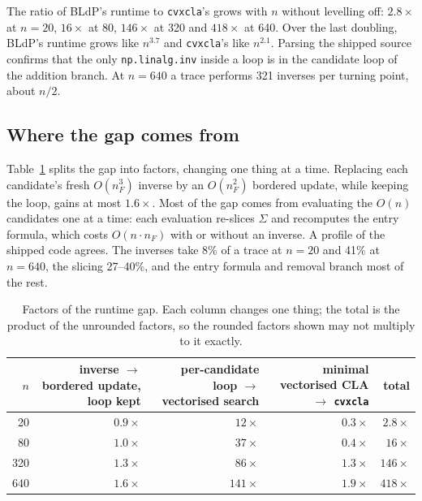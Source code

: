 \documentclass[11pt,a4paper]{article}
\newcommand{\code}[1]{\texttt{#1}}
\newcommand{\cvxcla}{\code{cvxcla}}
\begin{document}
The ratio of BLdP's runtime to \cvxcla{}'s grows with $n$ without levelling
off: $2.8\times$ at $n = 20$, $16\times$ at 80, $146\times$ at 320 and
$418\times$ at 640. Over the last doubling, BLdP's runtime grows like
$n^{3.7}$ and \cvxcla{}'s like $n^{2.1}$. Parsing the shipped source confirms
that the only \code{np.linalg.inv} inside a loop is in the candidate loop of
the addition branch. At $n = 640$ a trace performs 321 inverses per turning
point, about $n/2$.

\subsection{Where the gap comes from}

Table~\ref{tab:gap} splits the gap into factors, changing one thing at a time.
Replacing each candidate's fresh $O(n_F^3)$ inverse by an $O(n_F^2)$ bordered
update, while keeping the loop, gains at most $1.6\times$. Most of the gap
comes from evaluating the $O(n)$ candidates one at a time: each evaluation
re-slices $\Sigma$ and recomputes the entry formula, which costs
$O(n \cdot n_F)$ with or without an inverse. A profile of the shipped code
agrees. The inverses take 8\% of a trace at $n = 20$ and 41\% at $n = 640$,
the slicing 27--40\%, and the entry formula and removal branch most of the
rest.

\begin{table}[ht]
  \centering
  \small
  \caption{Factors of the runtime gap. Each column changes one thing; the
    total is the product of the unrounded factors, so the rounded factors
    shown may not multiply to it exactly.}\label{tab:gap}
  \begin{tabular}{rrrrr}
    \toprule
    $n$ & \shortstack[r]{inverse $\to$ bordered\\update, loop kept}
        & \shortstack[r]{per-candidate loop $\to$\\vectorised search}
        & \shortstack[r]{minimal vectorised\\CLA $\to$ \cvxcla{}}
        & total \\
    \midrule
    20  & $0.9\times$ & $12\times$  & $0.3\times$ & $2.8\times$ \\
    80  & $1.0\times$ & $37\times$  & $0.4\times$ & $16\times$  \\
    320 & $1.3\times$ & $86\times$  & $1.3\times$ & $146\times$ \\
    640 & $1.6\times$ & $141\times$ & $1.9\times$ & $418\times$ \\
    \bottomrule
  \end{tabular}
\end{table}
\end{document}
